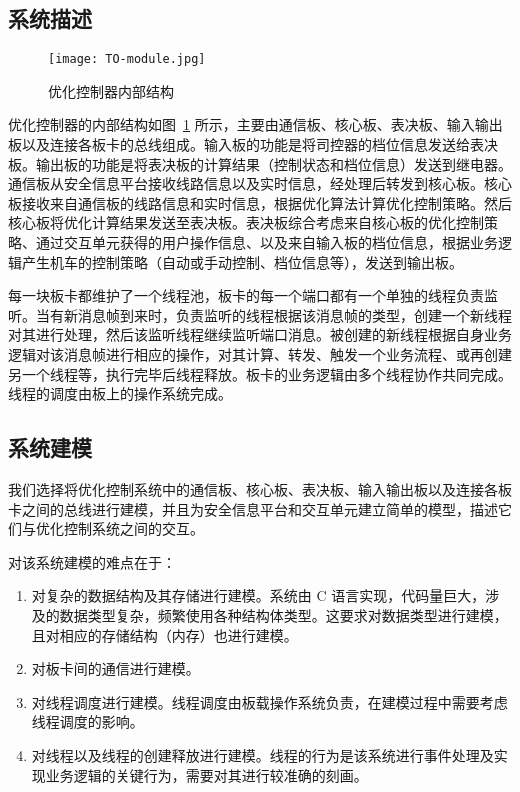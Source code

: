 \subsection{系统描述}

\begin{figure}
\centering
\texttt{[image: TO-module.jpg]}
\caption{优化控制器内部结构}
\label{f:TO-module}
\end{figure}

优化控制器的内部结构如图~\ref{f:TO-module} 所示，主要由通信板、核心板、表决板、输入输出板以及连接各板卡的总线组成。输入板的功能是将司控器的档位信息发送给表决板。输出板的功能是将表决板的计算结果（控制状态和档位信息）发送到继电器。通信板从安全信息平台接收线路信息以及实时信息，经处理后转发到核心板。核心板接收来自通信板的线路信息和实时信息，根据优化算法计算优化控制策略。然后核心板将优化计算结果发送至表决板。表决板综合考虑来自核心板的优化控制策略、通过交互单元获得的用户操作信息、以及来自输入板的档位信息，根据业务逻辑产生机车的控制策略（自动或手动控制、档位信息等），发送到输出板。

每一块板卡都维护了一个线程池，板卡的每一个端口都有一个单独的线程负责监听。当有新消息帧到来时，负责监听的线程根据该消息帧的类型，创建一个新线程对其进行处理，然后该监听线程继续监听端口消息。被创建的新线程根据自身业务逻辑对该消息帧进行相应的操作，对其计算、转发、触发一个业务流程、或再创建另一个线程等，执行完毕后线程释放。板卡的业务逻辑由多个线程协作共同完成。线程的调度由板上的操作系统完成。


\subsection{系统建模}

我们选择将优化控制系统中的通信板、核心板、表决板、输入输出板以及连接各板卡之间的总线进行建模，并且为安全信息平台和交互单元建立简单的模型，描述它们与优化控制系统之间的交互。

对该系统建模的难点在于：
\begin{enumerate}  
\item 对复杂的数据结构及其存储进行建模。系统由 C 语言实现，代码量巨大，涉及的数据类型复杂，频繁使用各种结构体类型。这要求对数据类型进行建模，且对相应的存储结构（内存）也进行建模。
\item 对板卡间的通信进行建模。
\item 对线程调度进行建模。线程调度由板载操作系统负责，在建模过程中需要考虑线程调度的影响。
\item 对线程以及线程的创建释放进行建模。线程的行为是该系统进行事件处理及实现业务逻辑的关键行为，需要对其进行较准确的刻画。
\end{enumerate}

